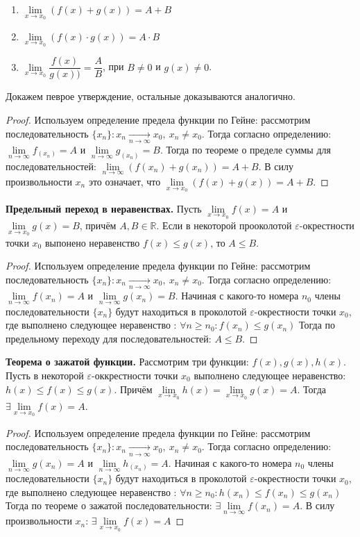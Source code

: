 \documentclass[12pt]{article}
\begin{document}
\begin{enumerate}
    \item $\lim\limits_{x \to x_0} (f(x) + g(x)) = A + B$
    \item $\lim\limits_{x \to x_0} (f(x) \cdot g(x)) = A \cdot B$
    \item $\lim\limits_{x \to x_0} \dfrac{f(x)}{g(x))} = \dfrac AB$, при $B \neq 0$ и $g(x) \neq 0$.
\end{enumerate}
Докажем певрое утверждение, остальные доказываются аналогично.
\begin{proof}
    Используем определение предела функции по Гейне: рассмотрим последовательность $\{x_n\} : x_n \xrightarrow[n \to \infty]{} x_0, \ x_n \neq x_0$. Тогда согласно определению: $\lim\limits_{n \to \infty} f_(x_n) = A$ и $\lim\limits_{n \to \infty} g_(x_n) = B$. Тогда по теореме о пределе суммы для последовательностей: $\lim\limits_{n \to \infty} \left(f(x_n) + g(x_n)\right) = A + B$. В силу произвольности $x_n$ это означает, что $\lim\limits_{x \to x_0} \left(f(x) + g(x) \right) = A + B$.
\end{proof}
\textbf{Предельный переход в неравенствах.} Пусть $\lim\limits_{x \to x_0} f(x) = A$ и $\lim\limits_{x \to x_0} g(x) = B$, причём $A, B \in \mathbb{R}$. Если в некоторой прооколотой $\varepsilon$-окрестности точки $x_0$ выпонено неравенство $f(x) \leq g(x)$, то $A \leq B$. 
\begin{proof}
    Используем определение предела функции по Гейне: рассмотрим последовательность $\{x_n\} : x_n \xrightarrow[n \to \infty]{} x_0, \ x_n \neq x_0$. Тогда согласно определению: $\lim\limits_{n \to \infty} f(x_n) = A$ и $\lim\limits_{n \to \infty} g(x_n) = B$. Начиная с какого-то номера $n_0$ члены последовательности $\{x_n\}$ будут находиться в проколотой $\varepsilon$-окрестности точки $x_0$, где выполнено следующее неравенство : $\forall n \geq n_0 : f(x_n) \leq g(x_n) $  Тогда по предельному переходу для последовательностей: $A \leq B$.
\end{proof}
\textbf{Теорема о зажатой функции.} Рассмотрим три функции: $f(x), g(x), h(x)$. Пусть в некоторой $\varepsilon$-оккрестности точки $x_0$ выполнено следующее неравенство: $h(x) \leq f(x) \leq g(x)$. Причём $\lim\limits_{x \to x_0} h(x) = \lim\limits_{x \to x_0} g(x) = A$. Тогда $\exists\lim\limits_{x \to x_0} f(x) = A$.
\begin{proof}
    Используем определение предела функции по Гейне: рассмотрим последовательность $\{x_n\} : x_n \xrightarrow[n \to \infty]{} x_0, \ x_n \neq x_0$. Тогда согласно определению: $\lim\limits_{n \to \infty} g(x_n) = A$ и $\lim\limits_{n \to \infty} h_(x_n) = A$. Начиная с какого-то номера $n_0$ члены последовательности $\{x_n\}$ будут находиться в проколотой $\varepsilon$-окрестности точки $x_0$, где выполнено следующее неравенство : $\forall n \geq n_0 : h(x_n) \leq f(x_n) \leq g(x_n) $  Тогда по теореме о зажатой последовательности: $\exists \lim\limits_{n \to \infty} f(x_n) = A$. В силу произвольности $x_n$: $\exists \lim\limits_{x \to x_0} f(x) = A$
\end{proof}
\end{document}
